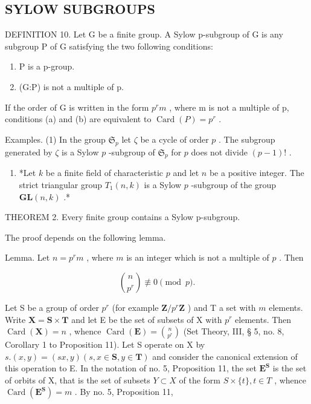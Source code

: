 \subsection{SYLOW SUBGROUPS}

DEFINITION 10. Let G be a finite group. A Sylow p-subgroup of G is any subgroup P of G satisfying the two following conditions:

\begin{enumerate}
\def\labelenumi{(\alph{enumi})}
\item
  P is a p-group.
\item
  (G:P) is not a multiple of p.
\end{enumerate}

If the order of G is written in the form \(p^{r}m\) , where m is not a multiple of p, conditions (a) and (b) are equivalent to \(\operatorname{Card}(P) = p^{r}\) .

Examples. (1) In the group \(\mathfrak{S}_p\) let \(\zeta\) be a cycle of order \(p\) . The subgroup generated by \(\zeta\) is a Sylow \(p\) -subgroup of \(\mathfrak{S}_p\) for \(p\) does not divide \((p - 1)!\) .

\begin{enumerate}
\def\labelenumi{(\arabic{enumi})}
\setcounter{enumi}{1}
\tightlist
\item
  *Let \(k\) be a finite field of characteristic \(p\) and let \(n\) be a positive integer. The strict triangular group \(T_1(n, k)\) is a Sylow \(p\) -subgroup of the group \(\mathbf{GL}(n, k)\) .*
\end{enumerate}

THEOREM 2. Every finite group contains a Sylow p-subgroup.

The proof depends on the following lemma.

Lemma. Let \(n = p^r m\) , where \(m\) is an integer which is not a multiple of \(p\) . Then

\[
\binom {n} {p ^ {r}} \not \equiv 0 \pmod {p}.
\]

Let S be a group of order \(p^r\) (for example \(\mathbf{Z} / p^r\mathbf{Z}\) ) and T a set with \(m\) elements. Write \(\mathbf{X} = \mathbf{S} \times \mathbf{T}\) and let E be the set of subsets of X with \(p^r\) elements. Then \(\operatorname{Card}(\mathbf{X}) = n\) , whence \(\operatorname{Card}(\mathbf{E}) = \binom{n}{p^r}\) (Set Theory, III, § 5, no. 8, Corollary 1 to Proposition 11). Let S operate on X by \(s.(x,y) = (sx,y)(s,x \in \mathbf{S},y \in \mathbf{T})\) and consider the canonical extension of this operation to E. In the notation of no. 5, Proposition 11, the set \(\mathbf{E}^{\mathbf{S}}\) is the set of orbits of X, that is the set of subsets \(Y \subset X\) of the form \(S \times \{t\}, t \in T\) , whence \(\operatorname{Card}(\mathbf{E}^{\mathbf{S}}) = m\) . By no. 5, Proposition 11,

